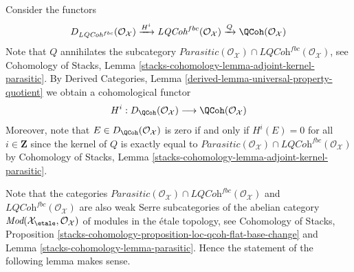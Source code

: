 \medskip\noindent
Consider the functors
$$
D_{\textit{LQCoh}^{fbc}}(\mathcal{O}_\mathcal{X})
\xrightarrow{H^i}
\textit{LQCoh}^{fbc}(\mathcal{O}_\mathcal{X})
\xrightarrow{Q}
\QCoh(\mathcal{O}_\mathcal{X})
$$
Note that $Q$ annihilates the subcategory
$\textit{Parasitic}(\mathcal{O}_\mathcal{X}) \cap
\textit{LQCoh}^{fbc}(\mathcal{O}_\mathcal{X})$, see
Cohomology of Stacks,
Lemma \ref{stacks-cohomology-lemma-adjoint-kernel-parasitic}.
By
Derived Categories, Lemma \ref{derived-lemma-universal-property-quotient}
we obtain a cohomological functor
\begin{equation}
\label{equation-Hi-quasi-coherent}
H^i :
D_\QCoh(\mathcal{O}_\mathcal{X})
\longrightarrow
\QCoh(\mathcal{O}_\mathcal{X})
\end{equation}
Moreover, note that $E \in D_\QCoh(\mathcal{O}_\mathcal{X})$
is zero if and only if $H^i(E) = 0$ for all $i \in \mathbf{Z}$
since the kernel of $Q$ is exactly equal to
$\textit{Parasitic}(\mathcal{O}_\mathcal{X}) \cap
\textit{LQCoh}^{fbc}(\mathcal{O}_\mathcal{X})$ by Cohomology of Stacks,
Lemma \ref{stacks-cohomology-lemma-adjoint-kernel-parasitic}.

\medskip\noindent
Note that the categories
$\textit{Parasitic}(\mathcal{O}_\mathcal{X}) \cap
\textit{LQCoh}^{fbc}(\mathcal{O}_\mathcal{X})$ and
$\textit{LQCoh}^{fbc}(\mathcal{O}_\mathcal{X})$
are also weak Serre subcategories of the abelian category
$\textit{Mod}(\mathcal{X}_\etale, \mathcal{O}_\mathcal{X})$
of modules in the \'etale topology, see
Cohomology of Stacks,
Proposition \ref{stacks-cohomology-proposition-loc-qcoh-flat-base-change} and
Lemma \ref{stacks-cohomology-lemma-parasitic}.
Hence the statement of the following lemma makes sense.


